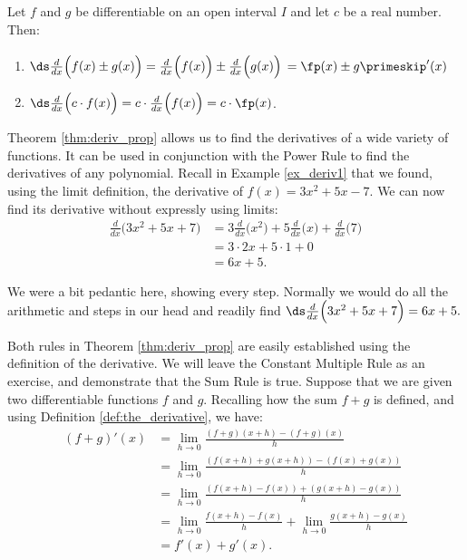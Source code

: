 {Let $f$ and $g$ be differentiable on an open interval $I$ and let $c$ be a real number. Then:
	\begin{enumerate}
	\item	{}
	
	$\ds \frac{d}{dx}\Big(f(x) \pm g(x)\Big) = \frac{d}{dx}\Big(f(x)\Big) \pm \frac{d}{dx}\Big(g(x)\Big)$ $= \rule{0pt}{15pt}\fp(x)\pm g\primeskip'(x)$
	\item		{}
	
	$\ds \frac{d}{dx}\Big(c\cdot f(x)\Big) = c\cdot\frac{d}{dx}\Big(f(x)\Big) = c\cdot\fp(x)$.
	\end{enumerate}
}

Theorem \ref{thm:deriv_prop} allows us to find the derivatives of a wide variety of functions. It can be used in conjunction with the Power Rule to find the derivatives of any polynomial. Recall in Example \ref{ex_deriv1} that we found, using the limit definition, the derivative of $f(x) = 3x^2+5x-7$. We can now find its derivative without expressly using limits:
		\begin{align*}
		\frac{d}{dx}\Big(3x^2+5x+7\Big) &= 3\frac{d}{dx}\Big(x^2\Big) + 5\frac{d}{dx}\Big(x\Big) + \frac{d}{dx}\Big(7\Big) \\
																		&= 3\cdot 2x+5\cdot 1+ 0\\
																		&= 6x+5.
		\end{align*}

We were a bit pedantic here, showing every step. Normally we would do all the arithmetic and steps in our head and readily find $\ds \frac{d}{dx}\Big(3x^2+5x+7\Big) = 6x+5.$

Both rules in Theorem \ref{thm:deriv_prop} are easily established using the definition of the derivative. We will leave the Constant Multiple Rule as an exercise, and demonstrate that the Sum Rule is true. Suppose that we are given two differentiable functions $f$ and $g$. Recalling how the sum $f+g$ is defined, and using Definition \ref{def:the_derivative}, we have:
\begin{align*}
(f+g)'(x) & = \lim_{h\to 0}\frac{(f+g)(x+h)-(f+g)(x)}{h}\\
 & = \lim_{h\to 0}\frac{(f(x+h)+g(x+h))-(f(x)+g(x))}{h}\\
 & = \lim_{h\to 0}\frac{(f(x+h)-f(x))+(g(x+h)-g(x))}{h}\\
 & = \lim_{h\to 0}\frac{f(x+h)-f(x)}{h}+\lim_{h\to 0}\frac{g(x+h)-g(x)}{h}\\
 & = f'(x)+g'(x).
\end{align*} \\

